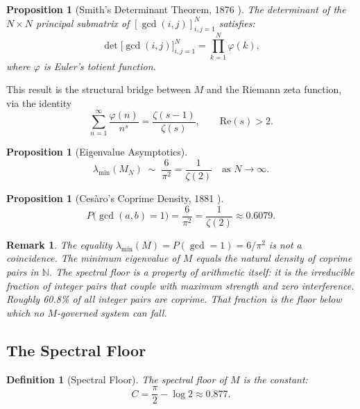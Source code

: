 \documentclass[12pt]{article}
\newtheorem{proposition}[theorem]{Proposition}
\newtheorem{definition}[theorem]{Definition}
\newtheorem{remark}[theorem]{Remark}
\begin{document}
\begin{proposition}[Smith's Determinant Theorem, 1876
\cite{Smith1876}]
\label{prop:smith}
The determinant of the $N \times N$ principal submatrix of
$[\gcd(i,j)]_{i,j=1}^N$ satisfies:
\begin{equation}
\det\bigl[\gcd(i,j)\bigr]_{i,j=1}^{N}
= \prod_{k=1}^{N} \varphi(k),
\label{eq:smith}
\end{equation}
where $\varphi$ is Euler's totient function.
\end{proposition}

This result is the structural bridge between $M$ and the
Riemann zeta function, via the identity
\[
\sum_{n=1}^{\infty} \frac{\varphi(n)}{n^s}
= \frac{\zeta(s-1)}{\zeta(s)}, \qquad \mathrm{Re}(s) > 2.
\]

\begin{proposition}[Eigenvalue Asymptotics]
\label{prop:eigen}
\begin{equation}
\lambda_{\min}(M_N) \;\sim\; \frac{6}{\pi^2} = \frac{1}{\zeta(2)}
\quad \text{as } N \to \infty.
\label{eq:eigenasym}
\end{equation}
\end{proposition}

\begin{proposition}[Ces\`aro's Coprime Density, 1881
\cite{Cesaro1881}]
\label{prop:cesaro}
\begin{equation}
P\bigl(\gcd(a,b) = 1\bigr) = \frac{6}{\pi^2}
= \frac{1}{\zeta(2)} \approx 0.6079.
\label{eq:cesaro}
\end{equation}
\end{proposition}

\begin{remark}
The equality $\lambda_{\min}(M) = P(\gcd = 1) = 6/\pi^2$ is
not a coincidence. The minimum eigenvalue of $M$ equals the
natural density of coprime pairs in $\mathbb{N}$. The spectral
floor is a property of arithmetic itself: it is the irreducible
fraction of integer pairs that couple with maximum strength
and zero interference. Roughly 60.8\% of all integer pairs
are coprime. That fraction is the floor below which no
$M$-governed system can fall.
\end{remark}

\subsection{The Spectral Floor}

\begin{definition}[Spectral Floor]
\label{def:C}
The \emph{spectral floor} of $M$ is the constant:
\begin{equation}
C = \frac{\pi}{2} - \log 2 \approx 0.877.
\label{eq:C}
\end{equation}
\end{definition}
\end{document}
